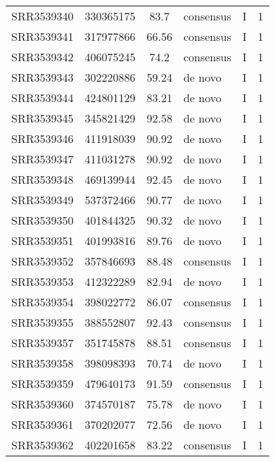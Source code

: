 \begin{scriptsize}
\begin{center}
\begin{longtable}{@{}lcclcc@{}}
SRR3539340 & 330365175     & 83.7        & consensus    & I        & 1        \\
SRR3539341 & 317977866     & 66.56       & consensus    & I        & 1        \\
SRR3539342 & 406075245     & 74.2        & consensus    & I        & 1        \\
SRR3539343 & 302220886     & 59.24       & de novo      & I        & 1        \\
SRR3539344 & 424801129     & 83.21       & de novo      & I        & 1        \\
SRR3539345 & 345821429     & 92.58       & de novo      & I        & 1        \\
SRR3539346 & 411918039     & 90.92       & de novo      & I        & 1        \\
SRR3539347 & 411031278     & 90.92       & de novo      & I        & 1        \\
SRR3539348 & 469139944     & 92.45       & de novo      & I        & 1        \\
SRR3539349 & 537372466     & 90.77       & de novo      & I        & 1        \\
SRR3539350 & 401844325     & 90.32       & de novo      & I        & 1        \\
SRR3539351 & 401993816     & 89.76       & de novo      & I        & 1        \\
SRR3539352 & 357846693     & 88.48       & consensus    & I        & 1        \\
SRR3539353 & 412322289     & 82.94       & de novo      & I        & 1        \\
SRR3539354 & 398022772     & 86.07       & consensus    & I        & 1        \\
SRR3539355 & 388552807     & 92.43       & consensus    & I        & 1        \\
SRR3539357 & 351745878     & 88.51       & consensus    & I        & 1        \\
SRR3539358 & 398098393     & 70.74       & de novo      & I        & 1        \\
SRR3539359 & 479640173     & 91.59       & consensus    & I        & 1        \\
SRR3539360 & 374570187     & 75.78       & de novo      & I        & 1        \\
SRR3539361 & 370202077     & 72.56       & de novo      & I        & 1        \\
SRR3539362 & 402201658     & 83.22       & consensus    & I        & 1        \\

\end{longtable}
\end{center}
\end{scriptsize}
